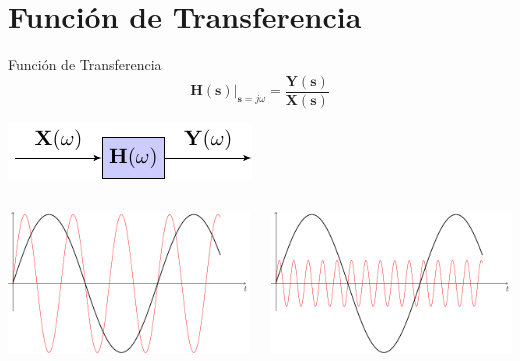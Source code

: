 \documentclass[xcolor={usenames,svgnames,dvipsnames}]{beamer}
\newcommand{\laplace}[1]{\mathbf{#1}(\mathbf{s})}
\newcommand{\slp}{\mathbf{s}}
\begin{document}
\section{Función de Transferencia}
\label{sec:org62e152e}
\begin{frame}[label={sec:org1319266}]{Función de Transferencia}
\[
  \laplace{H}\rvert_{\slp = j\omega} = \frac{\laplace{Y}}{\laplace{X}}
\]

\begin{center}
\includegraphics[width=.9\linewidth]{../figs/TransferFunction.pdf}
\end{center}


\begin{columns}
\begin{column}{0.5\columnwidth}
\begin{center}
\includegraphics[width=.9\linewidth]{../figs/sinX.pdf}
\end{center}
\end{column}

\begin{column}{0.5\columnwidth}
\begin{center}
\includegraphics[width=.9\linewidth]{../figs/sinY.pdf}
\end{center}
\end{column}
\end{columns}
\end{frame}
\end{document}
